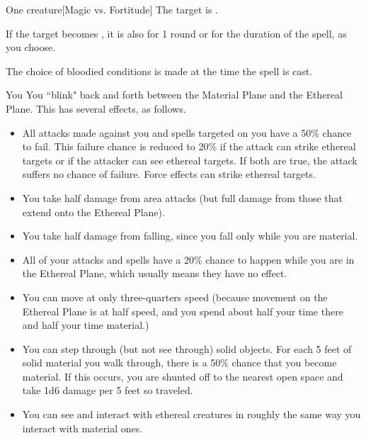 \spellrng{\rngclose}
\spelldur{\durshort \dismissable}
\begin{spelltarget}{One creature}[Magic vs. Fortitude]
    \spellsuccess The target is \sickened.

    If the target becomes \bloodied, it is also \blinded for 1 round or \deafened for the duration of the spell, as you choose.
\end{spelltarget}
\spellnotes The choice of bloodied conditions is made at the time the spell is cast.

\spellrng{\rngpers}
\spelldur{\durshort \dismissable}
\begin{spelltarget}{You}
    \spelleffect You ``blink" back and forth between the Material Plane and the Ethereal Plane. This has several effects, as follows.
    \begin{itemize}
        \item All attacks made against you and spells targeted on you have a 50\% chance to fail. This failure chance is reduced to 20\% if the attack can strike ethereal targets or if the attacker can see ethereal targets. If both are true, the attack suffers no chance of failure. Force effects can strike ethereal targets.
        \item You take half damage from area attacks (but full damage from those that extend onto the Ethereal Plane).
        \item You take half damage from falling, since you fall only while you are material.
        \item All of your attacks and spells have a 20\% chance to happen while you are in the Ethereal Plane, which usually means they have no effect.
        \item You can move at only three-quarters speed (because movement on the Ethereal Plane is at half speed, and you spend about half your time there and half your time material.)
        \item You can step through (but not see through) solid objects. For each 5 feet of solid material you walk through, there is a 50\% chance that you become material. If this occurs, you are shunted off to the nearest open space and take 1d6 damage per 5 feet so traveled. 
        \item You can see and interact with ethereal creatures in roughly the same way you interact with material ones.
    \end{itemize}
\end{spelltarget}

